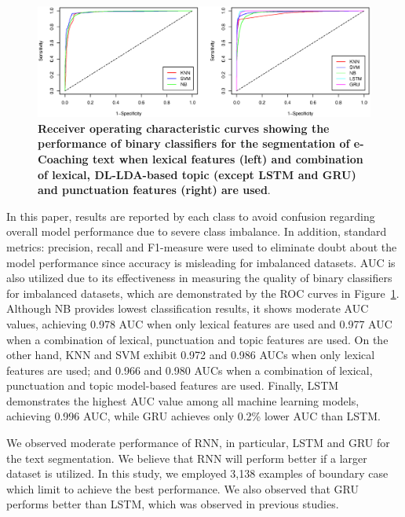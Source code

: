 \documentclass{amia}
\begin{document}
\begin{figure}[!htb]
    \centering
    \includegraphics[width=1.0\textwidth]{figures/roc-curves.eps}
    \caption{\textbf{Receiver operating characteristic curves showing the performance of binary classifiers for the segmentation of e-Coaching text when lexical features (left) and combination of lexical, DL-LDA-based topic (except LSTM and GRU) and punctuation features (right) are used}.}
    \label{fig:roc-curves}
\end{figure}

In this paper, results are reported by each class to avoid confusion regarding overall model performance due to severe class imbalance. In addition, standard metrics: precision, recall and F1-measure were used to eliminate doubt about the model performance since accuracy is misleading for imbalanced datasets. AUC is also utilized due to its effectiveness in measuring the quality of binary classifiers for imbalanced datasets\cite{hu2015kernelized}, which are demonstrated by the ROC curves in Figure~\ref{fig:roc-curves}. Although NB provides lowest classification results, it shows moderate AUC values, achieving 0.978 AUC when only lexical features are used and 0.977 AUC when a combination of lexical, punctuation and topic features are used. On the other hand, KNN and SVM exhibit 0.972 and 0.986 AUCs when only lexical features are used; and 0.966 and 0.980 AUCs when a combination of lexical, punctuation and topic model-based features are used. Finally, LSTM demonstrates the highest AUC value among all machine learning models, achieving 0.996 AUC, while GRU achieves only 0.2\% lower AUC than LSTM.      

We observed moderate performance of RNN, in particular, LSTM and GRU for the text segmentation. We believe that RNN will perform better if a larger dataset is utilized. In this study, we employed 3,138 examples of boundary case which limit to achieve the best performance. We also observed that GRU performs better than LSTM, which was observed in previous studies\cite{chung2014empirical}.
\end{document}
